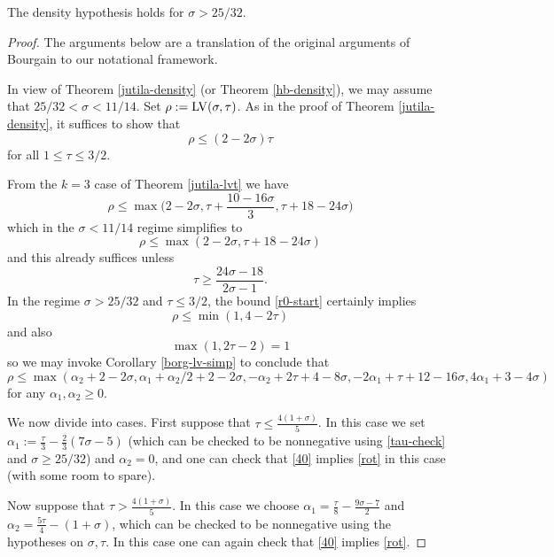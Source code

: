 \begin{theorem}\label{bourgain-density} The density hypothesis holds for $\sigma > 25/32$.
\end{theorem}

\literature
{}

\begin{proof}  The arguments below are a translation of the original arguments of Bourgain \cite{bourgain_large_2000} to our notational framework.

In view of Theorem \ref{jutila-density} (or Theorem \ref{hb-density}), we may assume that $25/32 < \sigma < 11/14$.  Set $\rho := \mathrm{LV}(\sigma,\tau)$. As in the proof of Theorem \ref{jutila-density}, it suffices to show that
\begin{equation}\label{rot}
    \rho \leq (2-2\sigma) \tau
\end{equation}
for all $1 \leq \tau \leq 3/2$.

From the $k=3$ case of Theorem \ref{jutila-lvt} we have
\begin{equation}\label{rhomax}
    \rho \leq \max \bigg(2-2\sigma, \tau + \frac{10-16\sigma}{3}, \tau + 18-24\sigma \bigg)
\end{equation}
which in the $\sigma < 11/14$ regime simplifies to
\begin{equation}\label{r0-start}
\rho \leq \max(2-2\sigma, \tau + 18-24\sigma)
\end{equation}
and this already suffices unless
\begin{equation}\label{tau-check}
     \tau \geq \frac{24\sigma-18}{2\sigma-1}.
\end{equation}
In the regime $\sigma > 25/32$ and $\tau \leq 3/2$, the bound \eqref{r0-start} certainly implies
$$ \rho \leq \min(1, 4-2\tau)$$
and also
$$ \max(1,2\tau-2) = 1$$
so we may invoke Corollary \ref{borg-lv-simp} to conclude that
\begin{equation}\label{40}
     \rho \leq \max( \alpha_2 + 2 - 2 \sigma, \alpha_1+\alpha_2/2 + 2-2\sigma, -\alpha_2 + 2\tau+4-8\sigma, -2\alpha_1 + \tau + 12 - 16 \sigma, 4\alpha_1 + 3-4\sigma)
\end{equation}
for any $\alpha_1, \alpha_2 \geq 0$.

We now divide into cases.  First suppose that $\tau \leq \frac{4(1+\sigma)}{5}$.  In this case we set $\alpha_1 := \frac{\tau}{3} - \frac{2}{3} (7\sigma-5)$ (which can be checked to be nonnegative using \eqref{tau-check} and $\sigma \geq 25/32$) and $\alpha_2=0$, and one can check that \eqref{40} implies \eqref{rot} in this case (with some room to spare).

Now suppose that $\tau > \frac{4(1+\sigma)}{5}$.  In this case we choose $\alpha_1 = \frac{\tau}{8} - \frac{9\sigma-7}{2}$ and $\alpha_2 = \frac{5\tau}{4} - (1+\sigma)$, which can be checked to be nonnegative using the hypotheses on $\sigma,\tau$.  In this case
one can again check that \eqref{40} implies \eqref{rot}.
\end{proof}

